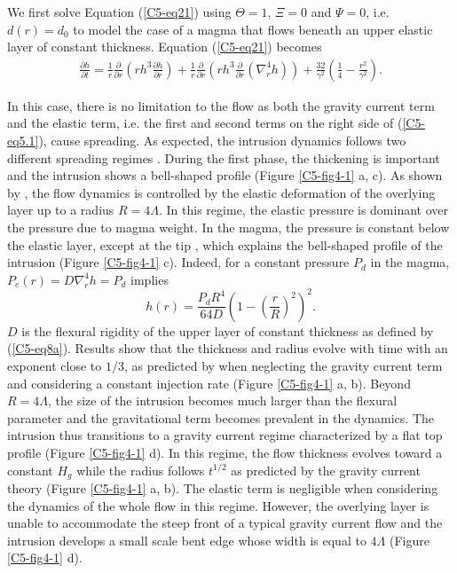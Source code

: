 We first solve Equation  (\ref{C5-eq21}) using $\Theta=1$, $\Xi=0$ and
$\Psi=0$,  i.e. $d(r)=d_0$  to model  the case  of a  magma that
flows beneath an  upper elastic layer of  constant thickness. Equation
(\ref{C5-eq21}) becomes
\begin{eqnarray}
  \frac{\partial h}{\partial t}=\frac{1}{r} \frac{\partial}{\partial r}\left (rh^{3} \frac{\partial h}{\partial r} \right)+ \frac{1}{r}\frac{\partial}{\partial r}\left ( rh^{3} \frac{\partial}{\partial r}\left ( \nabla^{4}_{r}h \right )\right)+\frac{32}{\gamma^{2}} \left(\frac{1}{4}-\frac{r^{2}}{\gamma^{2}}\right).
  \label{C5-eq5.1}
\end{eqnarray}

In this case, there  is no limitation to the flow  as both the gravity
current term and the elastic term,  i.e. the first and second terms on
the right side of (\ref{C5-eq5.1}),  cause spreading. As expected, the
intrusion   dynamics   follows   two   different   spreading   regimes
\citep{Michaut:2011kg,Michaut:2013dr,Bunger:2011cb}.  During the first
phase,  the  thickening  is  important   and  the  intrusion  shows  a
bell-shaped  profile  (Figure  \ref{C5-fig4-1}  a, c).   As  shown  by
\citet{Michaut:2011kg}, the flow dynamics is controlled by the elastic
deformation of  the overlying  layer up to  a radius  $R=4\Lambda$. In
this regime, the elastic pressure is dominant over the pressure due to
magma weight. In the magma, the pressure is constant below the elastic
layer, except  at the tip  \citep{Bunger:2011cb,Michaut:2011kg}, which
explains   the   bell-shaped   profile  of   the   intrusion   (Figure
\ref{C5-fig4-1}  c). Indeed,  for  a constant  pressure  $P_d$ in  the
magma, $P_e(r)=D\nabla_r^4h=P_d$ implies
\begin{equation}
  h(r)=\frac{P_{d} R^{4}}{64D}\left(1-\left(\frac{r}{R}\right)^2\right)^2.
  \label{C5-eq4-1}
\end{equation}
$D$ is the flexural rigidity of  the upper layer of constant thickness
as defined  by (\ref{C5-eq8a}).  Results  show that the  thickness and
radius evolve with time with an  exponent close to $1/3$, as predicted
by \citet{Michaut:2011kg} when neglecting the gravity current term and
considering  a  constant  injection rate  (Figure  \ref{C5-fig4-1}  a,
b). Beyond $R=4\Lambda$, the size of the intrusion becomes much larger
than  the  flexural  parameter  and  the  gravitational  term  becomes
prevalent in the dynamics. The intrusion thus transitions to a gravity
current   regime  characterized   by  a   flat  top   profile  (Figure
\ref{C5-fig4-1} d).  In this regime, the flow thickness evolves toward
a constant  $H_g$ while the  radius follows $t^{1/2}$ as  predicted by
the    gravity    current   theory    \citep{Huppert:1982a}    (Figure
\ref{C5-fig4-1} a, b). The elastic term is negligible when considering
the dynamics of the whole flow in this regime.  However, the overlying
layer is  unable to accommodate the  steep front of a  typical gravity
current flow \citep{Huppert:1982a} and  the intrusion develops a small
scale  bent   edge  whose  width   is  equal  to   $4\Lambda$  (Figure
\ref{C5-fig4-1} d).
		
